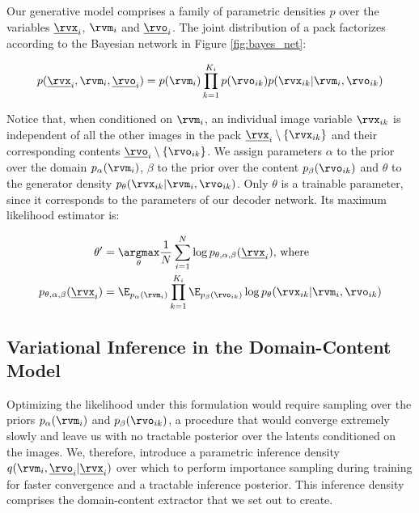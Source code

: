 \documentclass{article} %
\begin{document}
Our generative model comprises a family of parametric densities $p$ over the variables $\underline{\rvx}_i$, $\rvm_i$ and $\underline{\rvo}_i$. The joint distribution of a pack factorizes according to the Bayesian network in Figure \ref{fig:bayes_net}:

\begin{equation}
p(\underline{\rvx}_i, \rvm_i, \underline{\rvo}_i) = p(\rvm_i) \prod_{k=1}^{K_i} p(\rvo_{ik}) p(\rvx_{ik} | \rvm_i, \rvo_{ik})
\end{equation}

Notice that, when conditioned on $\rvm_i$, an individual image variable $\rvx_{ik}$ is independent of all the other images in the pack $\underline{\rvx}_i \setminus \{ \rvx_{ik} \}$ and their corresponding contents $\underline{\rvo}_i \setminus \{ \rvo_{ik} \}$. We assign parameters $\alpha$ to the prior over the domain $p_\alpha (\rvm_i)$, $\beta$ to the prior over the content $p_\beta (\rvo_{ik})$ and $\theta$ to the generator density $p_\theta (\rvx_{ik} | \rvm_i, \rvo_{ik})$. Only $\theta$ is a trainable parameter, since it corresponds to the parameters of our decoder network. Its maximum likelihood estimator is:

\begin{align}
\theta' &= \underset{\theta}{\argmax} \frac{1}{N} \sum_{i=1}^N \log p_{\theta, \alpha, \beta} (\underline{\rvx}_i) \textrm{, where } \\ p_{\theta, \alpha, \beta} (\underline{\rvx}_i) &= \E_{p_\alpha (\rvm_i)} \prod_{k=1}^{K_i} \E_{p_\beta (\rvo_{ik})} \log p_\theta (\rvx_{ik} | \rvm_i, \rvo_{ik})    
\end{align}

\subsection{Variational Inference in the Domain-Content Model}


Optimizing the likelihood under this formulation would require sampling over the priors $p_\alpha (\rvm_i)$ and $p_\beta (\rvo_{ik})$, a procedure that would converge extremely slowly and leave us with no tractable posterior over the latents conditioned on the images. We, therefore, introduce a parametric inference density $q(\rvm_i, \underline{\rvo}_i | \underline{\rvx}_i)$ over which to perform importance sampling during training for faster convergence and a tractable inference posterior. This inference density comprises the domain-content extractor that we set out to create.
\end{document}
